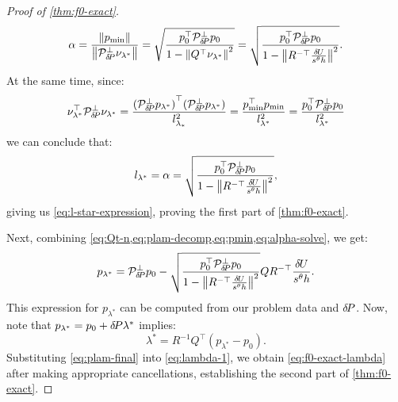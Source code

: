 \documentclass[sisc-eikonal.tex]{subfiles}
\begin{document}
\begin{proof}[Proof of \cref{thm:f0-exact}]
\begin{equation}
    \alpha = \frac{\left\|p_{\operatorname{min}}\right\|}{\left\|\mathcal{P}^\perp_{{\delta \hspace{-0.14em} P}} \nu_{\lambda^*}\right\|} = \sqrt{\frac{p_0^\top \mathcal{P}^\perp_{{\delta \hspace{-0.14em} P}} p_0}{1 - \left\|Q^\top \nu_{\lambda^*}\right\|^2}} = \sqrt{\frac{p_0^\top \mathcal{P}^\perp_{{\delta \hspace{-0.14em} P}} p_0}{1 - \left\|R^{-\top} \frac{{\delta \hspace{-0.09em} U}}{s^\theta h}\right\|^2}}.
  \end{equation}
  At the same time, since:
  \begin{equation}
    \nu_{\lambda^*}^\top \mathcal{P}^\perp_{{\delta \hspace{-0.14em} P}} \nu_{\lambda^*} = \frac{{(\mathcal{P}^\perp_{{\delta \hspace{-0.14em} P}} p_{\lambda^*})}^\top {(\mathcal{P}^\perp_{{\delta \hspace{-0.14em} P}} p_{\lambda^*})}}{l_{\lambda_*}^2} = \frac{p_{\operatorname{min}}^\top p_{\operatorname{min}}}{l_{\lambda^*}^2} = \frac{p_0^\top \mathcal{P}^\perp_{{\delta \hspace{-0.14em} P}} p_0}{l_{\lambda^*}^2}
  \end{equation}
  we can conclude that:
  \begin{equation}
    l_{\lambda^*} = \alpha = \sqrt{\frac{p_0^\top \mathcal{P}^\perp_{{\delta \hspace{-0.14em} P}} p_0}{1 - \left\|R^{-\top} \frac{{\delta \hspace{-0.09em} U}}{s^\theta h}\right\|^2}},
  \end{equation}
  giving us \cref{eq:l-star-expression}, proving the first part of
  \cref{thm:f0-exact}.

  Next, combining
  \cref{eq:Qt-n,eq:plam-decomp,eq:pmin,eq:alpha-solve}, we get:
  \begin{equation}\label{eq:plam-final}
    p_{\lambda^*} = \mathcal{P}^\perp_{\delP} p_0 - \sqrt{\frac{p_0^\top \mathcal{P}^\perp_{\delP} p_0}{1 - \norm{R^{-\top} \frac{\delU}{s^\theta h}}^2}} Q R^{-\top} \frac{\delU}{s^\theta h}.
  \end{equation}
  This expression for $p_{\lambda^*}$ can be computed from our problem
  data and ${\delta \hspace{-0.14em} P}$. Now, note that
  $p_{\lambda^*} = p_0 + {\delta \hspace{-0.14em} P} \lambda^*$ implies:
  \begin{equation}\label{eq:lambda-1}
    \lambda^* = R^{-1} Q^\top (p_{\lambda^*} - p_0).
  \end{equation}
  Substituting \cref{eq:plam-final} into \cref{eq:lambda-1}, we obtain
  \cref{eq:f0-exact-lambda} after making appropriate cancellations,
  establishing the second part of \cref{thm:f0-exact}.


\end{proof}
\end{document}

